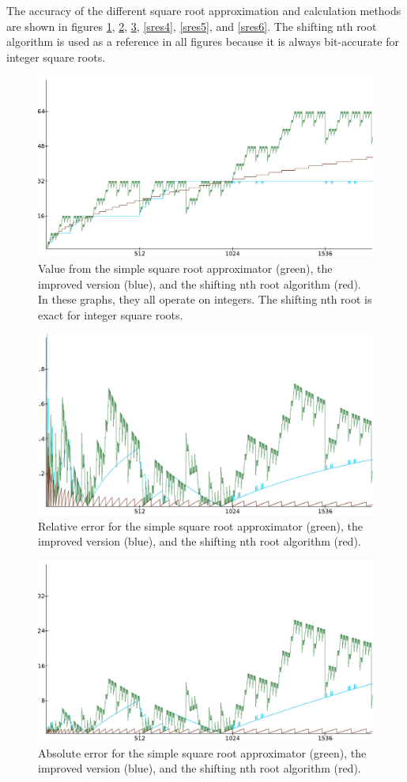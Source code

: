 		The accuracy of the different square root approximation and calculation
		methods are shown in figures \ref{sres1}, \ref{sres2}, \ref{sres3},
		\ref{sres4}, \ref{sres5}, and \ref{sres6}. The shifting nth root
		algorithm is used as a reference in all figures because it is always
		bit-accurate for integer square roots.

		\begin{figure}[H]
			\centering
			\includegraphics[width=0.75\linewidth]{figure/value12x.png} 
			\caption{Value from the simple square root approximator (green),
				the improved version (blue), and the shifting nth root 
				algorithm (red). In these graphs, they all operate on integers. 
				The shifting nth root is exact for integer square roots.}
			\label{sres1}
		\end{figure}

		\begin{figure}[H]
			\centering
			\includegraphics[width=0.75\linewidth]{figure/rel_error_480x.png} 
			\caption{Relative error for the simple square root approximator
				(green), the improved version (blue), and the shifting nth root
				algorithm (red).}
			\label{sres2}
		\end{figure}

		\begin{figure}[H]
			\centering
			\includegraphics[width=0.75\linewidth]{figure/abs_error_24x.png} 
			\caption{Absolute error for the simple square root approximator
				(green), the improved version (blue), and the shifting nth root
				algorithm (red).}
			\label{sres3}
		\end{figure}


